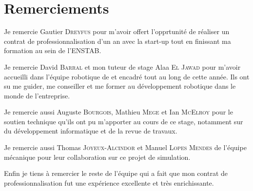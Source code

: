 \section*{Remerciements}

Je remercie Gautier \textsc{Dreyfus} pour m'avoir offert l'opprtunité de réaliser un contrat de professionnalisation d'un an avec la start-up \forssea{} tout en finissant ma formation au sein de l'\gls{ENSTAB}.

Je remercie David \textsc{Barral} et mon tuteur de stage Alaa \textsc{El Jawad} pour m'avoir accueilli dans l'équipe robotique de \forssea{} et encadré tout au long de cette année. Ils ont su me guider, me conseiller et me former au développement robotique dans le monde de l'entreprise.

Je remercie aussi Auguste \textsc{Bourgois}, Mathieu \textsc{Mege} et Ian \textsc{McElroy} pour le soutien technique qu'ils ont pu m'apporter au cours de ce stage, notamment sur du développement informatique et de la revue de travaux.

Je remercie aussi Thomas \textsc{Joyeux-Alcindor} et Manuel \textsc{Lopes Mendes} de l'équipe mécanique pour leur collaboration sur ce projet de simulation.

Enfin je tiens à remercier le reste de l'équipe \forssea{} qui a fait que mon contrat de professionnalisation fut une expérience excellente et très enrichissante.